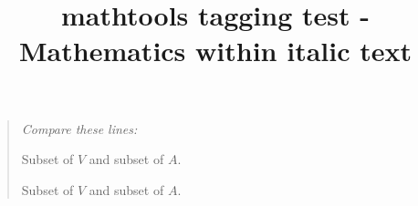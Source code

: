 \documentclass{article}
\title{mathtools tagging test - Mathematics within italic text}
\begin{document}
\begin{quote}\itshape
Compare these lines: \par
{} %
Subset of \(V\) and subset of \(A\). \par
{}
Subset of \(V\) and subset of \(A\).
\par
\end{quote}
\end{document}
